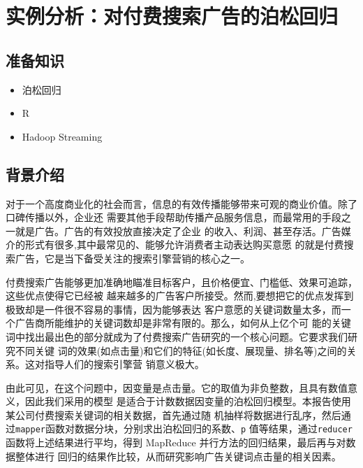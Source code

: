 \section{实例分析：对付费搜索广告的泊松回归}\label{ux5b9eux4f8bux5206ux6790ux5bf9ux4ed8ux8d39ux641cux7d22ux5e7fux544aux7684ux6ccaux677eux56deux5f52}

\subsection{准备知识}\label{ux51c6ux5907ux77e5ux8bc6}

\begin{itemize}
\itemsep1pt\parskip0pt
\item
  泊松回归
\item
  R
\item
  Hadoop Streaming
\end{itemize}

\subsection{背景介绍}\label{ux80ccux666fux4ecbux7ecd}

对于一个高度商业化的社会而言，信息的有效传播能够带来可观的商业价值。除了口碑传播以外，企业还
需要其他手段帮助传播产品服务信息，而最常用的手段之一就是广告。广告的有效投放直接决定了企业
的收入、利润、甚至存活。广告媒介的形式有很多,其中最常见的、能够允许消费者主动表达购买意愿
的就是付费搜索广告，它是当下备受关注的搜索引擎营销的核心之一。

付费搜索广告能够更加准确地瞄准目标客户，且价格便宜、门槛低、效果可追踪，这些优点使得它已经被
越来越多的广告客户所接受。然而,要想把它的优点发挥到极致却是一件很不容易的事情，因为能够表达
客户意愿的关键词数量太多，而一个广告商所能维护的关键词数却是非常有限的。那么，如何从上亿个可
能的关键词中找出最出色的部分就成为了付费搜索广告研究的一个核心问题。它要求我们研究不同关键
词的效果(如点击量)和它们的特征(如长度、展现量、排名等)之间的关系。这对指导人们的搜索引擎营
销意义极大。

由此可见，在这个问题中，因变量是点击量。它的取值为非负整数，且具有数值意义，因此我们采用的模型
是适合于计数数据因变量的泊松回归模型。本报告使用某公司付费搜索关键词的相关数据，首先通过随
机抽样将数据进行乱序，然后通过\lstinline!mapper!函数对数据分块，分别求出泊松回归的系数、\lstinline!p!
值等结果，通过\lstinline!reducer! 函数将上述结果进行平均，得到 MapReduce
并行方法的回归结果，最后再与对数据整体进行
回归的结果作比较，从而研究影响广告关键词点击量的相关因素。

